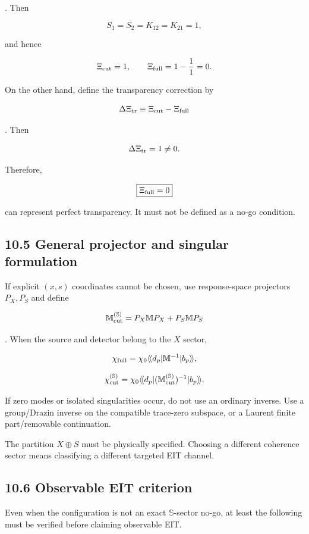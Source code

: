 \documentclass[
  10pt,
  a4paper,
]{article}
\begin{document}
. Then

\[
S_1=S_2=K_{12}=K_{21}=1,
\]

and hence

\[
\Xi_{\rm cut}=1,
\qquad
\Xi_{\rm full}
=1-\frac{1}{1}=0.
\]

On the other hand, define the transparency correction by

\[
\Delta\Xi_{\rm tr}
\equiv
\Xi_{\rm cut}-\Xi_{\rm full}
\]

. Then

\[
\Delta\Xi_{\rm tr}=1\neq0.
\]

Therefore,

\[
\boxed{
\Xi_{\rm full}=0
}
\]

can represent perfect transparency. It must not be defined as a no-go
condition.

\subsection{10.5 General projector and singular
formulation}\label{general-projector-and-singular-formulation}

If explicit \((x,s)\) coordinates cannot be chosen, use response-space
projectors \(P_X,P_S\) and define

\[
\mathbb M_{\rm cut}^{(\mathbb S)}
=P_X\mathbb MP_X+P_S\mathbb MP_S
\]

. When the source and detector belong to the \(X\) sector,

\[
\chi_{\rm full}
=\chi_0\langle\!\langle d_p|
\mathbb M^{-1}
|b_p\rangle\!\rangle,
\]

\[
\chi_{\rm cut}^{(\mathbb S)}
=\chi_0\langle\!\langle d_p|
(\mathbb M_{\rm cut}^{(\mathbb S)})^{-1}
|b_p\rangle\!\rangle.
\]

If zero modes or isolated singularities occur, do not use an ordinary
inverse. Use a group/Drazin inverse on the compatible trace-zero
subspace, or a Laurent finite part/removable continuation.

The partition \(X\oplus S\) must be physically specified. Choosing a
different coherence sector means classifying a different targeted EIT
channel.

\subsection{10.6 Observable EIT
criterion}\label{observable-eit-criterion}

Even when the configuration is not an exact \(\mathbb S\)-sector no-go,
at least the following must be verified before claiming observable EIT.
\end{document}
